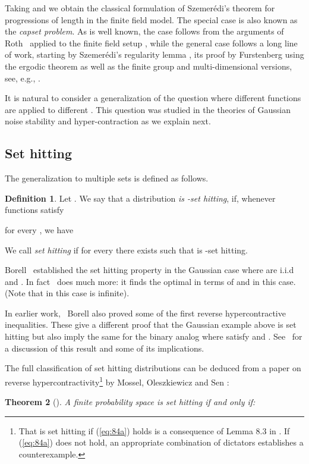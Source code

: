 \documentclass{daj}
\newcommand{\1}{\mathbbm{1}}
\theoremstyle{plain}
\newtheorem{theorem}{Theorem}[section]
\theoremstyle{definition}
\newtheorem{definition}[theorem]{Definition}
\begin{document}
Taking  and  we obtain the classical
formulation of Szemerédi's theorem for progressions of length 
in the finite field model. The special case  is also known
as the \emph{capset problem}.
As is well known, the case  follows from the arguments of
Roth~\cite{Rot53} applied to the finite field setup \cite{Mes95},
while the general case
follows a long line of work, starting by Szemerédi's regularity lemma
\cite{Sze75}, its proof by Furstenberg using the ergodic theorem \cite{Fur77}
as well as the finite group and multi-dimensional versions, see, e.g.,
\cite{Rot53, FK91, Gow01, Green05}.

It is natural to consider a generalization of the question where different
functions are applied to different . This question was studied in the
theories of Gaussian noise stability and hyper-contraction as we explain next.

\subsection{Set hitting} 
The generalization to multiple sets is defined as follows. 
\begin{definition}
\label{def:hitting}
Let . We say that a distribution
\emph{ is -set hitting},
if, whenever functions  satisfy

for every ,
we have


We call  \emph{set hitting} if for every 
 there exists  such that
 is -set hitting.
\end{definition}

Borell~\cite{Bor85} established the set hitting property in the Gaussian case where 
 are i.i.d and 
. 
In fact~\cite{Bor85} does much more: it finds the optimal  in terms of  and  in this case. 
(Note that in this case  is infinite). 

In earlier work,~\cite{Bor82} Borell also proved some of the first
reverse hypercontractive inequalities. 
 These give a different proof that the Gaussian example above is set hitting but also imply 
  the same for the binary analog where 
 satisfy  and .
See~\cite{MOR06} for a discussion of this result and some of its implications.   

The full classification of set hitting distributions can be deduced from
a paper on reverse hypercontractivity\footnote{
That  is set hitting if (\ref{eq:84a}) holds is a consequence
of Lemma 8.3 in \cite{MOS13}. If (\ref{eq:84a}) does not hold,
an appropriate combination of dictators establishes a counterexample.  
}
by Mossel, Oleszkiewicz and Sen
\cite{MOS13}:
\begin{theorem}[\cite{MOS13}]
\label{thm:different-sets-classification}
A finite probability space  is set hitting if and only if:

\end{theorem}
\end{document}
